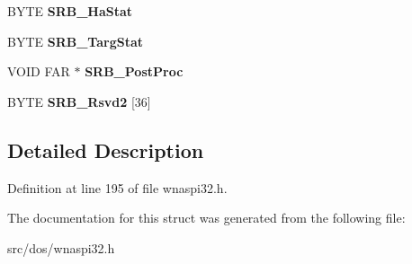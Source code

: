 \begin{DoxyCompactItemize}
\item 
\hypertarget{structSRB__BusDeviceReset_a3ed45ada909b380376e7cc9366f6edfd}{B\-Y\-T\-E {\bfseries S\-R\-B\-\_\-\-Ha\-Stat}}\label{structSRB__BusDeviceReset_a3ed45ada909b380376e7cc9366f6edfd}

\item 
\hypertarget{structSRB__BusDeviceReset_aaa48a8f3c5a1a9e9fa602f93dbf77691}{B\-Y\-T\-E {\bfseries S\-R\-B\-\_\-\-Targ\-Stat}}\label{structSRB__BusDeviceReset_aaa48a8f3c5a1a9e9fa602f93dbf77691}

\item 
\hypertarget{structSRB__BusDeviceReset_a37be9be7ea17a0538a3234b75cb966c6}{V\-O\-I\-D F\-A\-R $\ast$ {\bfseries S\-R\-B\-\_\-\-Post\-Proc}}\label{structSRB__BusDeviceReset_a37be9be7ea17a0538a3234b75cb966c6}

\item 
\hypertarget{structSRB__BusDeviceReset_a822a552e5e976e37174495c69bf30b3f}{B\-Y\-T\-E {\bfseries S\-R\-B\-\_\-\-Rsvd2} \mbox{[}36\mbox{]}}\label{structSRB__BusDeviceReset_a822a552e5e976e37174495c69bf30b3f}

\end{DoxyCompactItemize}


\subsection{Detailed Description}


Definition at line 195 of file wnaspi32.\-h.



The documentation for this struct was generated from the following file\-:\begin{DoxyCompactItemize}
\item 
src/dos/wnaspi32.\-h\end{DoxyCompactItemize}
